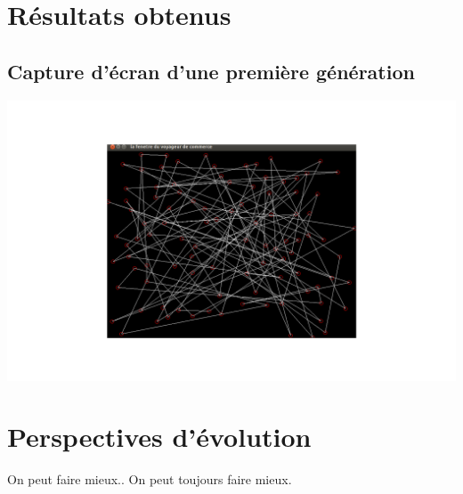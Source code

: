 \documentclass{report}
\begin{document}
\section{Résultats obtenus}
\subsection{Capture d'écran d'une première génération}
	\begin{center}
		\includegraphics[scale=0.3]{./1erGeneration.png}
		\label{fig1}
	\end{center}
\section{Perspectives d'évolution}
On peut faire mieux.. On peut toujours faire mieux.
\end{document}
